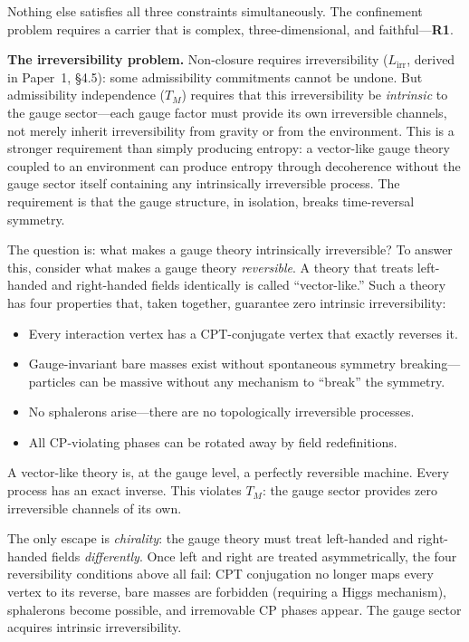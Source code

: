 \documentclass[11pt]{article}
\newenvironment{varlist}{\begin{itemize}[nosep,leftmargin=2em]}{\end{itemize}}
\begin{document}
\noindent Nothing else satisfies all three constraints simultaneously.  The confinement problem requires a carrier that is complex, three-dimensional, and faithful---\textbf{R1}.

\medskip
\textbf{The irreversibility problem.}  Non-closure requires irreversibility ($L_{\mathrm{irr}}$, derived in Paper~1, \S4.5): some admissibility commitments cannot be undone.  But admissibility independence ($T_M$) requires that this irreversibility be \emph{intrinsic} to the gauge sector---each gauge factor must provide its own irreversible channels, not merely inherit irreversibility from gravity or from the environment.  This is a stronger requirement than simply producing entropy: a vector-like gauge theory coupled to an environment can produce entropy through decoherence without the gauge sector itself containing any intrinsically irreversible process.  The requirement is that the gauge structure, in isolation, breaks time-reversal symmetry.

The question is: what makes a gauge theory intrinsically irreversible?  To answer this, consider what makes a gauge theory \emph{reversible}.  A theory that treats left-handed and right-handed fields identically is called ``vector-like.''  Such a theory has four properties that, taken together, guarantee zero intrinsic irreversibility:

\begin{varlist}
\item Every interaction vertex has a CPT-conjugate vertex that exactly reverses it.
\item Gauge-invariant bare masses exist without spontaneous symmetry breaking---particles can be massive without any mechanism to ``break'' the symmetry.
\item No sphalerons arise---there are no topologically irreversible processes.
\item All CP-violating phases can be rotated away by field redefinitions.
\end{varlist}

\noindent A vector-like theory is, at the gauge level, a perfectly reversible machine.  Every process has an exact inverse.  This violates $T_M$: the gauge sector provides zero irreversible channels of its own.

The only escape is \emph{chirality}: the gauge theory must treat left-handed and right-handed fields \emph{differently}.  Once left and right are treated asymmetrically, the four reversibility conditions above all fail: CPT conjugation no longer maps every vertex to its reverse, bare masses are forbidden (requiring a Higgs mechanism), sphalerons become possible, and irremovable CP phases appear.  The gauge sector acquires intrinsic irreversibility.
\end{document}
